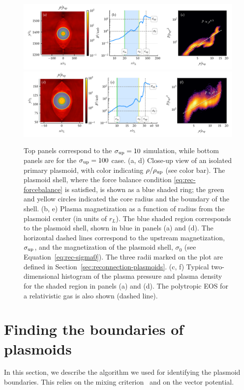 \begin{figure}[htb]
    \centering
    \includegraphics[width=\textwidth]{figures/ch2-reconnection/figa1_1.pdf}
    \includegraphics[width=\textwidth]{figures/ch2-reconnection/figa1_2.pdf}
    \caption{Top panels correspond to the $\sigma_{\rm up}=10$ simulation, while bottom panels are for the $\sigma_{\rm up}=100$ case. (a, d) Close-up view of an isolated primary plasmoid, with color indicating $\rho/\rho_{\rm up}$ (see color bar). The plasmoid shell, where the force balance condition \eqref{eq:rec-forcebalance} is satisfied, is shown as a blue shaded ring; the green and yellow circles indicated the core radius and the boundary of the shell. (b, e) Plasma magnetization as a function of radius from the plasmoid center (in units of $r_L$). The blue shaded region corresponds to the plasmoid shell, shown in blue in panels (a) and (d). The horizontal dashed lines correspond to the upstream magnetization, $\sigma_{\rm up}$, and the magnetization of the plasmoid shell, $\sigma_0$ (see Equation~\eqref{eq:rec-sigma0}). The three radii marked on the plot are defined in Section~\ref{sec:reconnection-plasmoids}. (c, f) Typical two-dimensional histogram of the plasma pressure and plasma density for the shaded region in panels (a) and (d). The polytropic EOS for a relativistic gas is also shown (dashed line).}
    \label{fig:rec-plasm_eos}
\end{figure}

\section{Finding the boundaries of plasmoids}
\label{appendix:rec-plasmbound}
In this section, we describe the algorithm we used for identifying the plasmoid boundaries. This relies on the mixing criterion~\citep{2014PhPl...21e2307D, 2017ApJ...850...29R} and on the vector potential.

